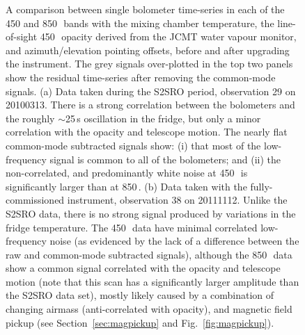 \documentclass[useAMS,usenatbib,nofootinbib]{mn2e}
\begin{document}
\begin{figure}
\caption{A comparison between single bolometer time-series in each of
  the 450 and 850\,\micron\ bands with the mixing chamber temperature,
  the line-of-sight 450\,\micron\ opacity derived from the JCMT water
  vapour monitor, and azimuth/elevation pointing offsets, before and
  after upgrading the instrument. The grey signals over-plotted in the
  top two panels show the residual time-series after removing the
  common-mode signals.  (a) Data taken during the S2SRO period,
  observation 29 on 20100313. There is a strong correlation between
  the bolometers and the roughly $\sim$25\,s oscillation in the
  fridge, but only a minor correlation with the opacity and telescope
  motion. The nearly flat common-mode subtracted signals show: (i)
  that most of the low-frequency signal is common to all of the
  bolometers; and (ii) the non-correlated, and predominantly white
  noise at 450\,\micron\ is significantly larger than at
  850\,\micron. (b) Data taken with the fully-commissioned instrument,
  observation 38 on 20111112. Unlike the S2SRO data, there is no
  strong signal produced by variations in the fridge temperature. The
  450\,\micron\ data have minimal correlated low-frequency noise (as
  evidenced by the lack of a difference between the raw and
  common-mode subtracted signals), although the 850\,\micron\ data
  show a common signal correlated with the opacity and telescope
  motion (note that this scan has a significantly larger amplitude
  than the S2SRO data set), mostly likely caused by a combination of
  changing airmass (anti-correlated with opacity), and magnetic field
  pickup (see Section~\ref{sec:magpickup} and
  Fig.~\ref{fig:magpickup}).}
\label{fig:bolos_mix}
\end{figure}
\end{document}
